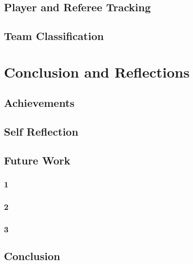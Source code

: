 \documentclass[12pt, letterpaper]{article}
\begin{document}
\subsection{Player and Referee Tracking}
\subsection{Team Classification}
\newpage

\section{Conclusion and Reflections}

\subsection{Achievements}
\subsection{Self Reflection}
\subsection{Future Work}
\subsubsection{1}
\subsubsection{2}
\subsubsection{3}
\subsection{Conclusion}
\newpage


\end{document}

